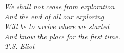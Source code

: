 
\clearemptydoublepage{}
\null{}
\begin{flushright}
    \textit{We shall not cease from exploration\\
    And the end of all our exploring\\
    Will be to arrive where we started\\
    And know the place for the first time.\\
    T.S. Eliot }
\end{flushright}
\null{}
